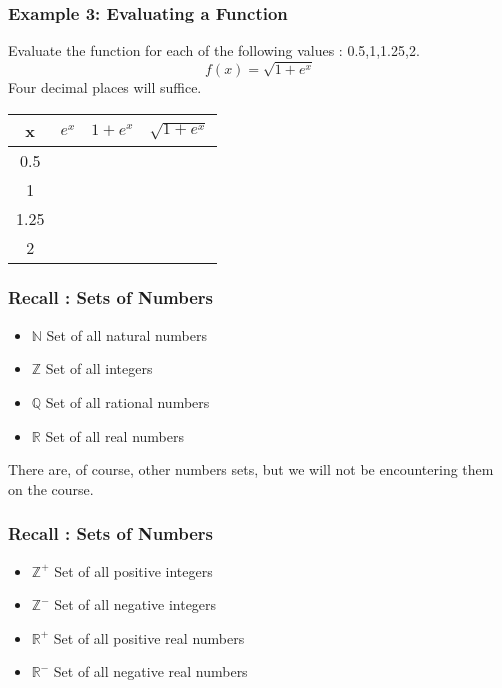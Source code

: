 \documentclass{beamer}
\begin{document}
\begin{frame}
	
	\frametitle{Example 3: Evaluating a Function}
	Evaluate the function for each of the following values : 0.5,1,1.25,2.
	{
		\Large
	\[f(x) =  \sqrt{1+e^{x}}  \]
}
	Four decimal places will suffice.
\end{frame}
\begin{frame}
	\begin{center}
		\begin{tabular}{|c|c|c|c|}
			\hline \rule[-2ex]{0pt}{5.5ex} x & $e^x$ & $1+e^x$ & $\sqrt{1+e^x}$ \\ \hline
			\hline \rule[-2ex]{0pt}{5.5ex} 0.5 & \phantom{space}  &  &  \\ 
			\hline \rule[-2ex]{0pt}{5.5ex} 1 &  &  &  \\ 
			\hline \rule[-2ex]{0pt}{5.5ex} 1.25 & \phantom{space}  &  &  \\ 
			\hline \rule[-2ex]{0pt}{5.5ex} 2 & \phantom{space}  &  & \phantom{space}  \\ 
			\hline 
		\end{tabular} 
	\end{center}
\end{frame}
\begin{frame}
	\frametitle{Recall : Sets of Numbers}
	\begin{itemize} 
		\item $\mathbb{N}$ Set of all natural numbers
		\item $\mathbb{Z}$ Set of all integers
		\item $\mathbb{Q}$ Set of all rational numbers
		\item $\mathbb{R}$ Set of all real numbers
	\end{itemize}
	
	\bigskip There are, of course, other numbers sets, but we will not be encountering them on the course.
\end{frame}

\begin{frame}
	\frametitle{Recall : Sets of Numbers}
	\begin{itemize}
		\item $\mathbb{Z}^{+}$ Set of all positive integers
		\item $\mathbb{Z}^{-}$ Set of all negative integers
		\item $\mathbb{R}^{+}$ Set of all positive real numbers
		\item $\mathbb{R}^{-}$ Set of all negative real numbers
	\end{itemize}
\end{frame}
\end{document}
